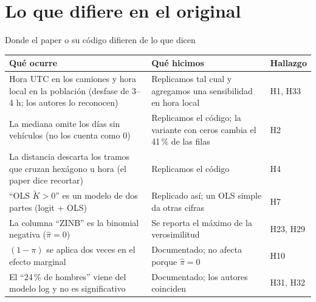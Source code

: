\documentclass[aspectratio=169,10pt,t]{beamer}
\begin{document}
\section{Lo que difiere en el original}

\begin{frame}{Donde el paper o su código difieren de lo que dicen}
  \centering\scriptsize
  \begin{tabular}{p{5.2cm}p{5.4cm}p{1.9cm}}\toprule
    Qué ocurre & Qué hicimos & Hallazgo \\\midrule
    Hora UTC en los camiones y hora local en la población (desfase de 3--4 h; los autores lo reconocen) & Replicamos tal cual y agregamos una sensibilidad en hora local & H1, H33 \\
    La mediana omite los días sin vehículos (no los cuenta como 0) & Replicamos el código; la variante con ceros cambia el 41\,\% de las filas & H2 \\
    La distancia descarta los tramos que cruzan hexágono u hora (el paper dice recortar) & Replicamos el código & H4 \\
    ``OLS $\tilde K>0$'' es un modelo de dos partes (logit + OLS) & Replicado así; un OLS simple da otras cifras & H7 \\
    La columna ``ZINB'' es la binomial negativa ($\hat\pi=0$) & Se reporta el máximo de la verosimilitud & H23, H29 \\
    $(1-\pi)$ se aplica dos veces en el efecto marginal & Documentado; no afecta porque $\hat\pi=0$ & H10 \\
    El ``24\,\% de hombres'' viene del modelo log y no es significativo & Documentado; los autores coinciden & H31, H32 \\\bottomrule
  \end{tabular}
\end{frame}
\end{document}

